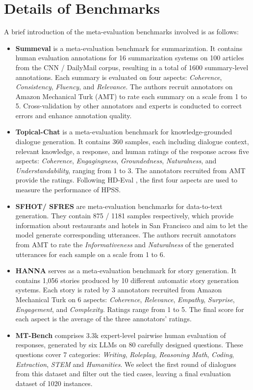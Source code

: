 \section{Details of Benchmarks}
\label{appendix:benchmarks}
A brief introduction of the meta-evaluation benchmarks involved is as follows:
\begin{itemize}
\item  \textbf{Summeval} \cite{fabbri-etal-2021-summeval} is a meta-evaluation benchmark for summarization. 
It contains human evaluation annotations for 16 summarization systems on 100 articles from the CNN / DailyMail corpus, resulting in a total of 1600 summary-level annotations. 
Each summary is evaluated on four aspects: \textit{Coherence}, \textit{Consistency}, \textit{Fluency}, and \textit{Relevance}. 
The authors recruit annotators on Amazon Mechanical Turk (AMT) to rate each summary on a scale from 1 to 5. 
Cross-validation by other annotators and experts is conducted to correct errors and enhance annotation quality.
\item \textbf{Topical-Chat} \cite{gopalakrishnan2019topical} is a meta-evaluation benchmark for knowledge-grounded dialogue generation. 
It contains 360 samples, each including dialogue context, relevant knowledge, a response, and human ratings of the response across five aspects: \textit{Coherence}, \textit{Engagingness}, \textit{Groundedness}, \textit{Naturalness}, and \textit{Understandability}, ranging from 1 to 3. 
The annotators recruited from AMT provide the ratings. 
Following HD-Eval \cite{liu-etal-2024-hd}, the first four aspects are used to measure the performance of HPSS.
\item \textbf{SFHOT/ SFRES} \cite{wen-etal-2015-semantically} are meta-evaluation benchmarks for data-to-text generation. 
They contain 875 / 1181 samples respectively, which provide information about restaurants and hotels in San Francisco and aim to let the model generate corresponding utterances. 
The authors recruit annotators from AMT to rate the \textit{Informativeness} and \textit{Naturalness} of the generated utterances for each sample on a scale from 1 to 6.
\item \textbf{HANNA} \cite{chhun-etal-2022-human} serves as a meta-evaluation benchmark for story generation. 
It contains 1,056 stories produced by 10 different automatic story generation systems. 
Each story is rated by 3 annotators recruited from Amazon Mechanical Turk on 6 aspects: \textit{Coherence}, \textit{Relevance}, \textit{Empathy}, \textit{Surprise}, \textit{Engagement}, and \textit{Complexity}. 
Ratings range from 1 to 5. The final score for each aspect is the average of the three annotators' ratings.
\item \textbf{MT-Bench} \cite{zheng2023judging} comprises 3.3k expert-level pairwise human evaluation of responses,  generated by six LLMs on 80 carefully designed questions. 
These questions cover 7 categories: \textit{Writing}, \textit{Roleplay},
\textit{Reasoning Math}, 
\textit{Coding}, \textit{Extraction}, \textit{STEM} and \textit{Humanities}.
We select the first round of dialogues from this dataset and filter out the tied cases, leaving a final evaluation dataset of 1020 instances.


\end{itemize}
